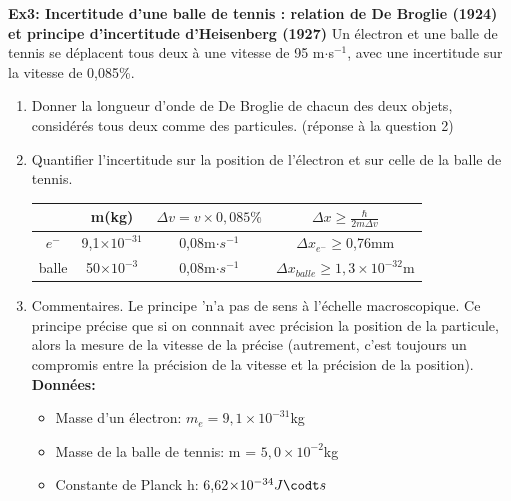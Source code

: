 \documentclass{article}
\begin{document}
\noindent\textbf{Ex3: Incertitude d'une balle de tennis : relation de De Broglie (1924) et principe d'incertitude d'Heisenberg (1927)}\newline
\indent Un électron et une balle de tennis se déplacent tous deux à une vitesse de 95 m$\cdot$s$^{-1}$, avec une incertitude sur la vitesse de 0,085\%.
\begin{enumerate}
    \item Donner la longueur d'onde de De Broglie de chacun des deux objets, considérés tous deux comme des particules.\newline
    (réponse à la question 2)
    \item Quantifier l'incertitude sur la position de l'électron et sur celle de la balle de tennis.\newline
    \begin{tabular}{|c|c|c|c|}
        \hline
         & m(kg) & $\Delta v = v\times 0,085\%$ & $\Delta x \geqslant \frac{\hbar}{2m\Delta v}$\\
        \hline
        $e^{-}$ & 9,1$\times 10^{-31}$ & 0,08m$\cdot s^{-1}$ & $\Delta x_{e^{-}}\geqslant$0,76mm\\
        \hline
        balle & 50$\times 10^{-3}$ & 0,08m$\cdot s^{-1}$ & $\Delta x_{balle}\geqslant 1,3\times 10^{-32}$m\\
        \hline
    \end{tabular}
    \item Commentaires.\newline
    Le principe 'n'a pas de sens à l'échelle macroscopique. Ce principe précise que si on connnait avec précision la position de la particule, alors la mesure de la vitesse de la précise (autrement, c'est toujours un compromis entre la précision de la vitesse et la précision de la position).\newline\newline
    \textbf{Données:}
    \begin{itemize}
        \item Masse d'un électron: $m_{e}=9,1\times 10^{-31}$kg
        \item Masse de la balle de tennis: m = $5,0\times 10^{-2}$kg
        \item Constante de Planck h: 6,62$\times 10^{-34} J\codt s$
    \end{itemize}
\end{enumerate}
\end{document}
